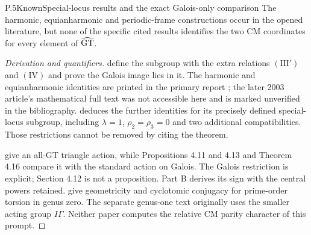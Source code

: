 \begin{statement}{P.5}{Known}{Special-locus results and the exact Galois-only comparison}
The harmonic, equianharmonic and periodic-frame constructions occur
in the opened literature, but none of the specific cited results
identifies the two CM coordinates for every element of $\widehat{\mathrm{GT}}$.
\end{statement}
\begin{proof}[Derivation and quantifiers]
\citet[Theorems 1.1--1.2]{LitNakamuraSchneps2000} define the subgroup
with the extra relations $(\mathrm{III}')$ and $(\mathrm{IV})$ and
prove the Galois image lies in it. The harmonic and equianharmonic
identities are printed in the primary report
\citet[Theorems 1--2]{LitTsunogaiNakamura2002}; the later 2003
article's mathematical full text was not accessible here and is marked
unverified in the bibliography. \citet[Theorem 3.4]{LitSchneps2006}
deduces the further identities for its precisely defined special-locus
subgroup, including $\lambda=1$, $\rho_2=\rho_3=0$ and two additional
compatibilities. Those restrictions cannot be removed by citing the
theorem.

\citet[Proposition 4.4]{LitNakamuraTsunogaiYasuda2010} give an
all-GT triangle action, while Propositions 4.11 and 4.13 and
Theorem 4.16 compare it with the standard action on Galois. The
Galois restriction is explicit; Section 4.12 is not a proposition.
Part B derives its sign with the central powers retained.
\citet[Theorems A and B]{Collas2012GenusZero} give geometricity and
cyclotomic conjugacy for prime-order torsion in genus zero. The
separate genus-one text \citep{CollasGenusOneAuthorText} originally
uses the smaller acting group $I\Gamma$. Neither paper computes the
relative CM parity character of this prompt.
\end{proof}

